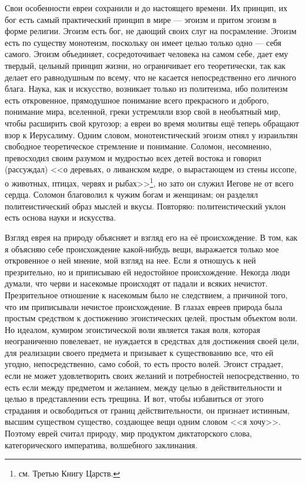 \documentclass[12pt,oneside]{book}
\begin{document}
Свои особенности евреи сохранили и до настоящего времени. Их принцип, их бог есть самый практический принцип в мире --- эгоизм и притом эгоизм в форме религии. Эгоизм есть бог, не дающий своих слуг на посрамление. Эгоизм есть по существу монотеизм, поскольку он имеет целью только одно --- себя самого. Эгоизм объединяет, сосредоточивает человека на самом себе, дает ему твердый, цельный принцип жизни, но ограничивает его теоретически, так как делает его равнодушным по всему, что не касается непосредственно его личного блага. Наука, как и искусство, возникает только из политеизма, ибо политеизм есть откровенное, прямодушное понимание всего прекрасного и доброго, понимание мира, вселенной, греки устремляли взор свой в необъятный мир, чтобы расширить свой кругозор; а евреи во время молитвы ещё теперь обращают взор к Иерусалиму. Одним словом, монотеистический эгоизм отнял у израильтян свободное теоретическое стремление и понимание. Соломон, несомненно, превосходил своим разумом и мудростью всех детей востока и говорил (рассуждал) <<о деревьях, о ливанском кедре, о вырастающем из стены иссопе, о животных, птицах, червях и рыбах>>\ddag\let\svthefootnote\thefootnote\let\thefootnote\relax{}\let\thefootnote\svthefootnote\footnote{см. Третью Книгу Царств.}, но зато он служил Иегове не от всего сердца. Соломон благоволил к чужим богам и женщинам; он разделял политеистический образ мыслей и вкусы. Повторяю: политеистический уклон есть основа науки и искусства.



Взгляд еврея на природу объясняет и взгляд его на её происхождение. В том, как я объясняю себе происхождение какой-нибудь вещи, выражается только мое откровенное о ней мнение, мой взгляд на нее. Если я отношусь к ней презрительно, но и приписываю ей недостойное происхождение. Некогда люди думали, что черви и насекомые происходят от падали и всяких нечистот. Презрительное отношение к насекомым было не следствием, а причиной того, что им приписывали нечистое происхождение. В глазах евреев природа была простым средством к достижению эгоистических целей, простым объектом воли. Но идеалом, кумиром эгоистической воли является такая воля, которая неограниченно повелевает, не нуждается в средствах для достижения своей цели, для реализации своего предмета и призывает к существованию все, что ей угодно, непосредственно, само собой, то есть просто волей. Эгоист страдает, если не может удовлетворить своих желаний и потребностей непосредственно, то есть если между предметом и желанием, между целью в действительности и целью в представлении есть трещина. И вот, чтобы избавиться от этого страдания и освободиться от границ действительности, он признает истинным, высшим существом существо, создающее вещи одним словом <<я хочу>>. Поэтому еврей считал природу, мир продуктом диктаторского слова, категорического императива, волшебного заклинания.
\end{document}
